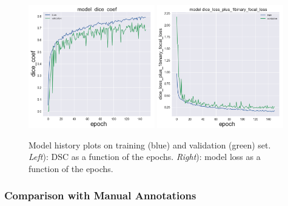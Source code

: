 \documentclass{standalone}
\begin{document}
\begin{figure}[ht]

    \centering
    \includegraphics[width=0.49\textwidth]{../images/dice_coef.png}
	\includegraphics[width=0.49\textwidth]{../images/loss.png}

    \caption{Model history plots on training (blue) and validation (green) set. \textit{Left}): DSC as a function of the epochs. \textit{Right}): model loss as a function of the epochs.}
    \label{training}
    
\end{figure}
\clearpage
\newpage

\subsubsection{Comparison with Manual Annotations}
\end{document}
